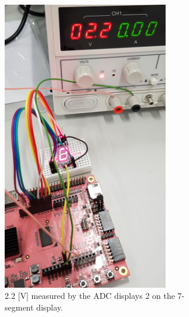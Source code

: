 \documentclass[../report.tex]{subfiles}
\begin{document}
\begin{figure}[H]
    \begin{subfigure}[t]{0.45\textwidth}   
        \centering 
        \includegraphics[width=0.8\textwidth]{figures/xadc/2V_result.jpg}
        \captionsetup{width=0.8\textwidth}
        \caption{2.2 [V] measured by the ADC displays 2 on the 7-segment display.}  
        \label{}
    \end{subfigure}
    \begin{subfigure}[t]{0.45\textwidth}   
        \centering 

\end{subfigure}
\end{figure}
\end{document}

